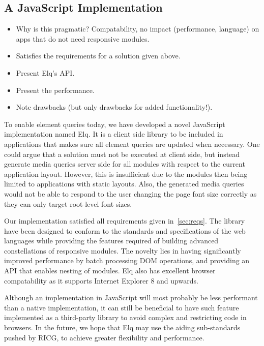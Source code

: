 \documentclass{acm_proc_article-sp}
\begin{document}
  \subsection{A JavaScript Implementation}
    \begin{itemize}
      \item Why is this pragmatic? Compatability, no impact (performance, language) on apps that do not need responsive modules.
      \item Satisfies the requirements for a solution given above.
      \item Present Elq's API.
      \item Present the performance.
      \item Note drawbacks (but only drawbacks for added functionality!).
    \end{itemize}

    To enable element queries today, we have developed a novel JavaScript implementation named Elq.
    It is a client side library to be included in applications that makes sure all element queries are updated when necessary.
    One could argue that a solution must not be executed at client side, but instead generate media queries server side for all modules with respect to the current application layout.
    However, this is insufficient due to the modules then being limited to applications with static layouts.
    Also, the generated media queries would not be able to respond to the user changing the page font size correctly as they can only target root-level font sizes.

    Our implementation satisfied all requirements given in~\ref{sec:reqs}.
    The library have been designed to conform to the standards and specifications of the web languages while providing the features required of building advanced constellations of responsive modules.
    The novelty lies in having significantly improved performance by batch processing DOM operations, and providing an API that enables nesting of modules.
    Elq also has excellent browser compatability as it supports Internet Explorer 8 and upwards.

    Although an implementation in JavaScript will most probably be less performant than a native implementation, it can still be beneficial to have such feature implemented as a third-party library to avoid complex and restricting code in browsers.
    In the future, we hope that Elq may use the aiding sub-standards pushed by RICG, to achieve greater flexibility and performance.
\end{document}
